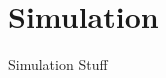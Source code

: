 
\section{Simulation}
\label{sec:Simulation}

Simulation Stuff \cite{Allison:2006ve, *Agostinelli:2002hh}